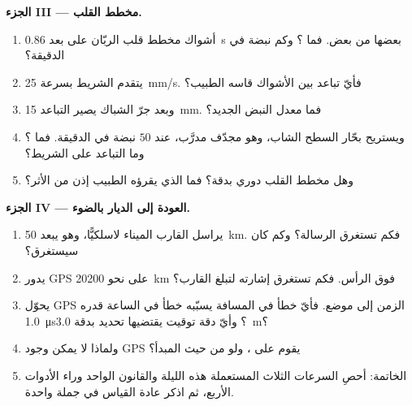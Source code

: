 \begin{problem}[{مسألة نهاية الأسبوع --- قراءة إشارات العالم: قانون
واحد، $d = v\,t$، يقيس بعد عاصفة، ويرسم خريطة قاع، ويعدّ نبض قلب، ويستخرج
كيف يعمل GPS}]
\medskip
\noindent\textbf{الجزء III --- مخطط القلب.}
\begin{enumerate}[resume]
  \item أشواك مخطط قلب الربّان على بعد \qty{0.86}{s} بعضها من بعض. فما ؟
        وكم نبضة في الدقيقة؟
  \item يتقدم الشريط بسرعة \qty{25}{mm/s}. فأيّ تباعد بين الأشواك قاسه
        الطبيب؟
  \item وبعد جرّ الشباك يصير التباعد \qty{15}{mm}. فما معدل النبض الجديد؟
  \item ويستريح بحّار السطح الشاب، وهو مجدّف مدرَّب، عند $50$ نبضة في
        الدقيقة. فما ؟ وما التباعد على الشريط؟
  \item وهل مخطط القلب دوري بدقة؟ فما الذي يقرؤه الطبيب إذن
        من الأثر؟
\end{enumerate}

\medskip
\noindent\textbf{الجزء IV --- العودة إلى الديار بالضوء.}
\begin{enumerate}[resume]
  \item يراسل القارب الميناء لاسلكيًّا، وهو يبعد \qty{50}{km}. فكم تستغرق
        الرسالة؟ وكم كان  سيستغرق؟
  \item يدور  GPS على نحو \qty{20200}{km} فوق الرأس. فكم تستغرق
        إشارته لتبلغ القارب؟
  \item يحوّل GPS الزمن إلى موضع. فأيّ خطأ في المسافة يسبّبه خطأ
        في الساعة قدره \qty{1.0}{\micro s}؟ وأيّ دقة توقيت يقتضيها تحديد
        بدقة \qty{3.0}{m}؟
  \item ولماذا لا يمكن وجود GPS يقوم على ، ولو من حيث المبدأ؟
  \item الخاتمة: أحصِ السرعات الثلاث المستعملة هذه الليلة والقانون الواحد
        وراء الأدوات الأربع، ثم اذكر عادة القياس  في جملة
        واحدة.
\end{enumerate}
\end{problem}
